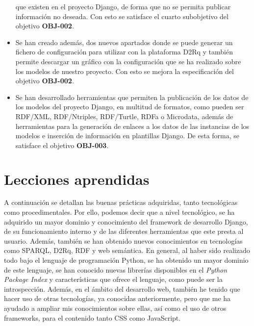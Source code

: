 \begin{itemize}
    	que existen en el proyecto Django, de forma que no se permita publicar
        información no deseada. Con esto se satisface el cuarto subobjetivo del
        objetivo \textbf{OBJ-002}.
    \item Se han creado además, dos nuevos apartados donde se puede generar un
        fichero de configuración para utilizar con la plataforma D2Rq y también
        permite descargar un gráfico con la configuración que se ha realizado
        sobre los modelos de nuestro proyecto. Con esto se mejora la
        especificación del objetivo \textbf{OBJ-002}.
    \item Se han desarrollado herramientas que permiten la publicación de los
        datos de los modelos del proyecto Django, en multitud de formatos, como
        pueden ser RDF/XML, RDF/Ntriples, RDF/Turtle, RDFa o Microdata, además
        de herramientas para la generación de enlaces a los datos de las
        instancias de los modelos e inserción de información en plantillas
        Django. De esta forma, se satisface el objetivo \textbf{OBJ-003}.
\end{itemize}


\section{Lecciones aprendidas}

A continuación se detallan las buenas prácticas adquiridas, tanto tecnológicas
como procedimentales. Por ello, podemos decir que a nivel tecnológico, se ha
adquirido un mayor dominio y conocimiento del framework de desarrollo Django, de
su funcionamiento interno y de las diferentes herramientas que este presta al
usuario. Además, también se han obtenido nuevos conocimientos en tecnologías como
SPARQL, D2Rq, RDF y web semántica. En general, al haber sido realizado todo bajo
el lenguaje de programación Python, se ha obtenido un mayor dominio de este
lenguaje, se han conocido nuevas librerías disponibles en el
\textit{Python Package Index} y características que ofrece el lenguaje, como
puede ser la introspección. Además, en el ámbito del desarrollo web, también he
tenido que hacer uso de otras tecnologías, ya conocidas anteriormente, pero que
me ha ayudado a ampliar mis conocimientos sobre ellas, así como el uso de otros
frameworks, para el contenido tanto CSS como JavaScript.

